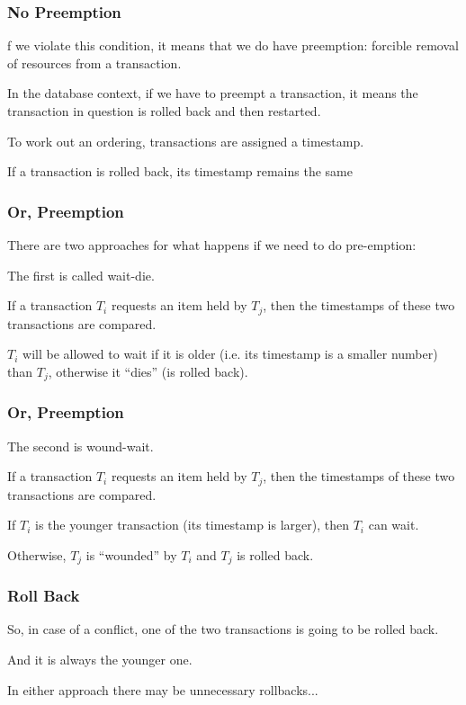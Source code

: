 \begin{frame}
\frametitle{No Preemption}
f we violate this condition, it means that we do have preemption: forcible removal of resources from a transaction. 

In the database context, if we have to preempt a transaction, it means the transaction in question is rolled back and then restarted. 

To work out an ordering, transactions are assigned a timestamp. 

If a transaction is rolled back, its timestamp remains the same
\end{frame}


\begin{frame}
\frametitle{Or, Preemption}
There are two approaches for what happens if we need to do pre-emption:

The first is called \alert{wait-die}. 

If a transaction $T_{i}$ requests an item held by $T_{j}$, then the timestamps of these two transactions are compared. 

$T_{i}$ will be allowed to wait if it is older (i.e. its timestamp is a smaller number) than $T_{j}$, otherwise it ``dies'' (is rolled back). 


\end{frame}

\begin{frame}
\frametitle{Or, Preemption}

The second is \alert{wound-wait}. 

If a transaction $T_{i}$ requests an item held by $T_{j}$, then the timestamps of these two transactions are compared. 

If $T_{i}$ is the younger transaction (its timestamp is larger), then $T_{i}$ can wait. 

Otherwise, $T_{j}$ is ``wounded'' by $T_{i}$ and $T_{j}$ is rolled back.

\end{frame}

\begin{frame}
\frametitle{Roll Back}

So, in case of a conflict, one of the two transactions is going to be rolled back. 

And it is always the younger one. 

In either approach there may be unnecessary rollbacks...

\end{frame}

